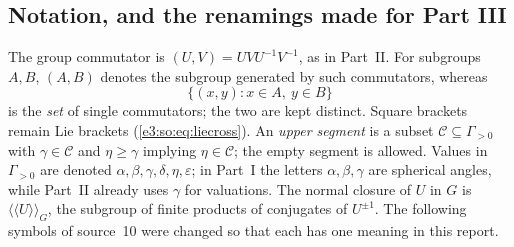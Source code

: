 \documentclass[11pt,letterpaper]{article}
\numberwithin{equation}{section}
\theoremstyle{definition}
\theoremstyle{remark}
\newcommand{\eps}{\varepsilon}
\newcommand{\comm}[2]{\left(#1,#2\right)}
\newcommand{\nc}[1]{\langle\!\langle #1\rangle\!\rangle}
\newcommand{\commset}[2]{\{\comm{x}{y}:x\in #1,\ y\in #2\}}
\begin{document}
\subsection{Notation, and the renamings made for Part III}\label{e3:cut:sub:notation}

The group commutator is $\comm UV=UVU^{-1}V^{-1}$, as in Part~II. For
subgroups $A,B$, $\comm AB$ denotes the subgroup generated by such
commutators, whereas
\[
 \commset AB
\]
is the \emph{set} of single commutators; the two are kept distinct. Square
brackets remain Lie brackets (\cref{e3:so:eq:liecross}). An \emph{upper
segment} is a subset $\mathcal C\subseteq\Gamma_{>0}$ with $\gamma\in\mathcal C$
and $\eta\ge\gamma$ implying $\eta\in\mathcal C$; the empty segment is allowed.
Values in $\Gamma_{>0}$ are denoted $\alpha,\beta,\gamma,\delta,\eta,\eps$; in
Part~I the letters $\alpha,\beta,\gamma$ are spherical angles, while Part~II
already uses $\gamma$ for valuations. The normal closure of $U$ in $G$ is
$\nc U_G$, the subgroup of finite products of conjugates of $U^{\pm1}$. The
following symbols of source~10 were changed so that each has one meaning in
this report.
\end{document}

